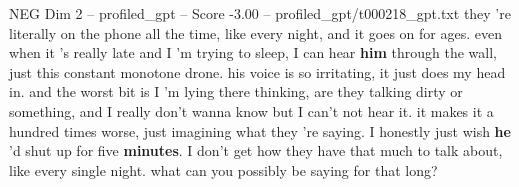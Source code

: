 \begin{textsample}{NEG Dim 2 – profiled\_gpt – Score -3.00 – profiled\_gpt/t000218\_gpt.txt}  \label{ex:f2_neg_035}
they 're literally on the phone all the time, like every night, and it goes on for ages. even when it 's really late and I 'm trying to sleep, I can hear \textbf{him} through the wall, just this constant monotone drone. his voice is so irritating, it just does my head in. and the worst bit is I 'm lying there thinking, are they talking dirty or something, and I really don't wanna know but I can't not hear it. it makes it a hundred times worse, just imagining what they 're saying.
I honestly just wish \textbf{he} 'd shut up for five \textbf{minutes}.
I don't get how they have that much to talk about, like every single night. what can you possibly be saying for that long?

\end{textsample}
